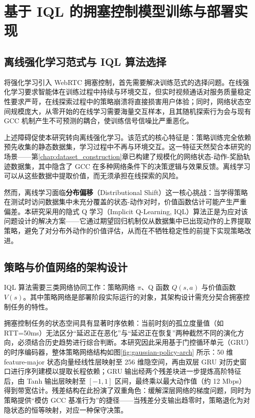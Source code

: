 \chapter{基于 IQL 的拥塞控制模型训练与部署实现}
\label{chap:train_iql_model}

\section{离线强化学习范式与 IQL 算法选择}

将强化学习引入 WebRTC 拥塞控制，首先需要解决训练范式的选择问题。在线强化学习要求智能体在训练过程中持续与环境交互，但实时视频通话对服务质量稳定性要求严苛，在线探索过程中的策略崩溃将直接损害用户体验；同时，网络状态空间规模庞大，从零开始的在线学习需要海量交互样本，且其随机探索行为会与现有 GCC 机制产生不可预测的耦合，使训练信号信噪比严重恶化。

上述障碍促使本研究转向离线强化学习。该范式的核心特征是：策略训练完全依赖预先收集的静态数据集，学习过程中不再与环境交互。这一特征天然契合本研究的场景——第\ref{chap:dataset_construction}章已构建了规模化的网络状态-动作-奖励轨迹数据集，其中隐含了 GCC 在多种网络条件下的决策逻辑与效果反馈。离线学习可以从这些数据中提取价值，而无须承担在线探索的风险。

然而，离线学习面临\textbf{分布偏移}（Distributional Shift）这一核心挑战：当学得策略在测试时访问数据集中未充分覆盖的状态-动作对时，价值函数估计可能产生严重偏差。本研究采用的隐式 Q 学习（Implicit Q-Learning, IQL）算法正是为应对该问题设计的解决方案——它通过期望回归机制仅从数据集中已出现动作的上界提取策略，避免了对分布外动作的价值评估，从而在不牺牲稳定性的前提下实现策略改进。

\section{策略与价值网络的架构设计}

IQL 算法需要三类网络协同工作：策略网络 $\pi$、Q 函数 $Q(s,a)$ 与价值函数 $V(s)$。其中策略网络是部署阶段实际运行的对象，其架构设计需充分契合拥塞控制任务的特性。

拥塞控制任务的状态空间具有显著时序依赖：当前时刻的孤立度量值（如 RTT=50ms）无法区分“延迟正在恶化”与“延迟正在恢复”两种截然不同的演化方向，必须结合历史趋势进行综合判断。本研究因此采用基于门控循环单元（GRU）的时序编码器，整体策略网络结构如图\ref{fig:gaussian-policy-arch} 所示：50 维 feature-major 状态向量经线性层映射至 256 维隐空间，再由双层 GRU 对历史窗口进行序列建模以提取长程依赖；GRU 输出经两个残差块进一步提炼高阶特征后，由 Tanh 输出层映射至 $[-1, 1]$ 区间，最终乘以最大动作值（约 12 Mbps）得到带宽估计。残差结构在此扮演了双重角色：缓解深层网络的梯度问题，同时为策略提供“模仿 GCC 基准行为”的捷径——当残差分支输出趋零时，策略退化为对隐状态的恒等映射，对应一种保守决策。

